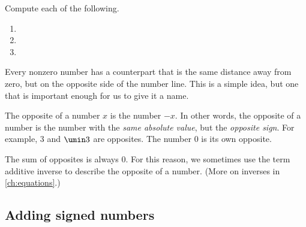 \begin{boxex}
Compute each of the following.

\begin{enumerate}[itemsep=10pt]
\item {}

\item {}

\item {}
\end{enumerate}
\end{boxex}

Every nonzero number has a counterpart that is the same distance away from zero, but on the opposite side of the number line. This is a simple idea, but one that is important enough for us to give it a name.

\begin{boxdef}[Opposite]
The \gls{opposite} of a number $x$ is the number $-x$. In other words, the opposite of a number is the number with the \textit{same absolute value}, but the \textit{opposite sign}. For example, 3 and $\umin3$ are opposites. The number 0 is its own opposite.

\begin{center}
\end{center}
\end{boxdef}

The sum of opposites is always 0. For this reason, we sometimes use the term \gls{additive inverse} to describe the opposite of a number. (More on inverses in \cref{ch:equations}.)

\subsection{Adding signed numbers}

